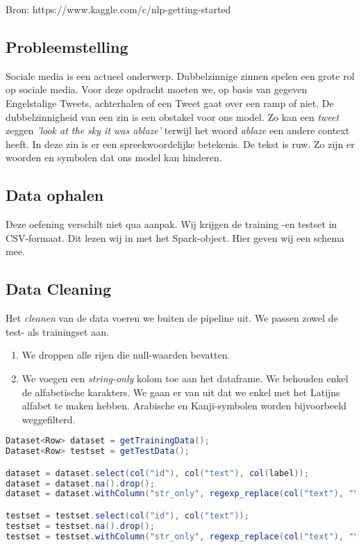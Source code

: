 \documentclass[a4paper,10pt,twoside]{report}
\begin{document}
Bron: https://www.kaggle.com/c/nlp-getting-started

\subsection*{Probleemstelling}

Sociale media is een actueel onderwerp. Dubbelzinnige zinnen spelen een grote rol op sociale media. Voor deze opdracht moeten we, op basis van gegeven Engelstalige Tweets, achterhalen of een Tweet gaat over een ramp of niet. De dubbelzinnigheid van een zin is een obstakel voor ons model. Zo kan een \textit{tweet} zeggen \textit{'look at the sky it was ablaze'} terwijl het woord \textit{ablaze} een andere context heeft. In deze zin is er een spreekwoordelijke betekenis. De tekst is ruw. Zo zijn er woorden en symbolen dat ons model kan hinderen.

\subsection*{Data ophalen}

Deze oefening verschilt niet qua aanpak. Wij krijgen de training -en testset in CSV-formaat. Dit lezen wij in met het Spark-object. Hier geven wij een schema mee.

\subsection*{Data Cleaning}

Het \textit{cleanen} van de data voeren we buiten de pipeline uit. We passen zowel de test- als trainingset aan.

\begin{enumerate}
	\item We droppen alle rijen die null-waarden bevatten.
	\item We voegen een \textit{string-only} kolom toe aan het dataframe. We behouden enkel de alfabetische karakters. We gaan er van uit dat we enkel met het Latijns alfabet te maken hebben. Arabische en Kanji-symbolen worden bijvoorbeeld weggefilterd.
\end{enumerate}

\begin{lstlisting}[language=Java]
Dataset<Row> dataset = getTrainingData();
Dataset<Row> testset = getTestData();

dataset = dataset.select(col("id"), col("text"), col(label));
dataset = dataset.na().drop();
dataset = dataset.withColumn("str_only", regexp_replace(col("text"), "\\d+", ""));

testset = testset.select(col("id"), col("text"));
testset = testset.na().drop();
testset = testset.withColumn("str_only", regexp_replace(col("text"), "\\d+", ""));
\end{lstlisting}
\end{document}
